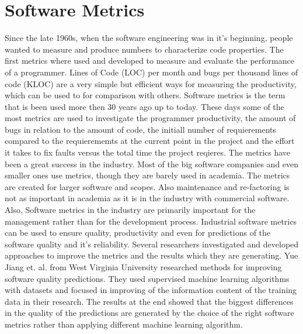 \section{Software Metrics}
Since the late 1960s, when the software engineering was in it's beginning, people wanted to measure and produce numbers to characterize code properties. 
The first metrics where used and developed to measure and evaluate the performance of a programmer. Lines of Code (LOC) per month and bugs per thousand lines of code (KLOC) are a very simple but efficient ways for measuring the productivity, which can be used to for comparison with others.
Software metrics is the term that is been used more then 30 years ago up to today. 
These days some of the most metrics are used to investigate the programmer productivity, the amount of bugs in relation to the amount of code, the initiall number of requierements compared to the requierememts at the current point in the project and the effort it takes to fix faults versus the total time the project reqieres. \cite{kaner2004software}
The metrics have been a great success in the industry. Most of the big software companies and even smaller ones use metrics, though they are barely used in academia. 
The metrics are created for larger software and scopes. Also maintenance and re-factoring is not as important in academia as it is in the industry with commercial software. Also, Software metrics in the industry are primarily important for the management rather than for the development process. 
Industrial software metrics can be used to ensure quality, productivity and even for predictions of the software quality and it's reliability. 
\cite{fenton1999software}
Several researchers investigated and developed approaches to improve the metrics and the results which they are generating. 
Yue Jiang et. al. from West Virginia University researched methods for improving software quality predictions. They used supervised machine learning algorithms with datasets and focused in improving of the information content of the training data in their research. The results at the end showed that the biggest differences in the quality of the predictions are generated by the choice of the right software metrics rather than applying different machine learning algorithm. 
\cite{jiang2008comparing} 



